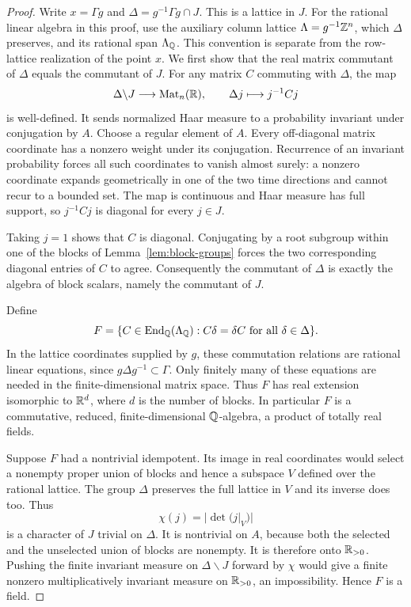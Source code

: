 \begin{proof}
Write $x=\Gamma g$ and
$\Delta=g^{-1}\Gamma g\cap J$. This is a lattice in $J$.
For the rational linear algebra in this proof, use the auxiliary column
lattice $\Lambda=g^{-1}\mathbb Z^n$, which $\Delta$ preserves, and its rational
span $\Lambda_{\mathbb Q}$. This convention is separate from the row-lattice
realization of the point $x$.
We first show that the real matrix commutant of $\Delta$ equals the
commutant of $J$.
For any matrix $C$ commuting with $\Delta$, the map
\[
 \Delta\backslash J\longrightarrow\operatorname{Mat}_n(\mathbb R),\qquad
 \Delta j\longmapsto j^{-1}Cj
\]
is well-defined. It sends normalized Haar measure to a probability
invariant under conjugation by $A$. Choose a regular element of $A$.
Every off-diagonal matrix coordinate has a nonzero weight under its
conjugation. Recurrence of an invariant probability forces all such
coordinates to vanish almost surely: a nonzero coordinate expands
geometrically in one of the two time directions and cannot recur to a
bounded set. The map is continuous and Haar measure has full support,
so $j^{-1}Cj$ is diagonal for every $j\in J$.

Taking $j=1$ shows that $C$ is diagonal. Conjugating by a root subgroup
within one of the blocks of Lemma~\ref{lem:block-groups} forces the two
corresponding diagonal entries of $C$ to agree. Consequently the
commutant of $\Delta$ is exactly the algebra of block scalars, namely
the commutant of $J$.

Define
\[
 F=\{C\in\operatorname{End}_{\mathbb Q}(\Lambda_{\mathbb Q}):C\delta=\delta C
                                     \text{ for all }\delta\in\Delta\}.
\]
In the lattice coordinates supplied by $g$, these commutation relations
are rational linear equations, since $g\Delta g^{-1}\subset\Gamma$.
Only finitely many of these equations are needed in the finite-dimensional
matrix space. Thus $F$ has real extension
isomorphic to $\mathbb R^d$, where $d$ is the number of blocks. In particular
$F$ is a commutative, reduced, finite-dimensional $\mathbb Q$-algebra, a product
of totally real fields.

Suppose $F$ had a nontrivial idempotent. Its image in real coordinates
would select a nonempty proper union of blocks and hence a subspace $V$
defined over the rational lattice. The group $\Delta$ preserves the
full lattice in $V$ and its inverse does too. Thus
\[
 \chi(j)=|\det(j|_V)|
\]
is a character of $J$ trivial on $\Delta$. It is nontrivial on $A$,
because both the selected and the unselected union of blocks are
nonempty. It is therefore onto $\mathbb R_{>0}$. Pushing the finite invariant
measure on $\Delta\backslash J$ forward by $\chi$ would give a finite
nonzero multiplicatively invariant measure on $\mathbb R_{>0}$, an
impossibility. Hence $F$ is a field.


\end{proof}
